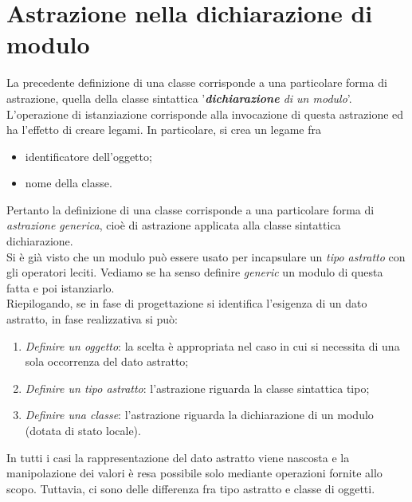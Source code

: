\documentclass[12pt]{report}
\begin{document}
		\section{Astrazione nella dichiarazione di modulo}
		La precedente definizione di una classe corrisponde a una particolare forma di astrazione, quella della classe sintattica '\textit{\textbf{dichiarazione} di un modulo}'. \\
		L'operazione di istanziazione corrisponde alla invocazione di questa astrazione ed ha l'effetto di creare legami. In particolare, si crea un legame fra
		\begin{itemize}
			\item identificatore dell'oggetto;
			\item nome della classe.
		\end{itemize}
		Pertanto la definizione di una classe corrisponde a una particolare forma di \textit{astrazione generica}, cioè di astrazione applicata alla classe sintattica dichiarazione. \\
		Si è già visto che un modulo può essere usato per incapsulare un \textit{tipo astratto} con gli operatori leciti. Vediamo se ha senso definire \textit{generic} un modulo di questa fatta e poi istanziarlo. \\
		Riepilogando, se in fase di progettazione si identifica l'esigenza di un dato astratto, in fase realizzativa si può:
		\begin{enumerate}
			\item \textit{Definire un oggetto}: la scelta è appropriata nel caso in cui si necessita di una sola occorrenza del dato astratto;
			\item \textit{Definire un tipo astratto}: l'astrazione riguarda la classe sintattica tipo;
			\item \textit{Definire una classe}: l'astrazione riguarda la dichiarazione di un modulo (dotata di stato locale).
		\end{enumerate}
		In tutti i casi la rappresentazione del dato astratto viene nascosta e la manipolazione dei valori è resa possibile solo mediante operazioni fornite allo scopo. Tuttavia, ci sono delle differenza fra tipo astratto e classe di oggetti.
\end{document}
